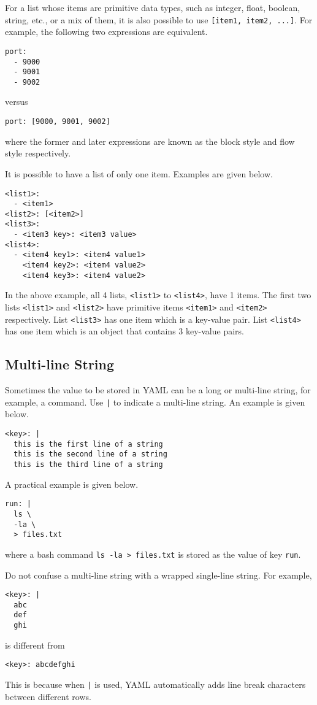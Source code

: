 For a list whose items are primitive data types, such as integer, float, boolean, string, etc., or a mix of them, it is also possible to use \verb|[item1, item2, ...]|. For example, the following two expressions are equivalent.
\begin{lstlisting}
port:
  - 9000
  - 9001
  - 9002
\end{lstlisting}
versus
\begin{lstlisting}
port: [9000, 9001, 9002]
\end{lstlisting}
where the former and later expressions are known as the block style and flow style respectively.

It is possible to have a list of only one item. Examples are given below.
\begin{lstlisting}
<list1>:
  - <item1>
<list2>: [<item2>]
<list3>:
  - <item3 key>: <item3 value>
<list4>:
  - <item4 key1>: <item4 value1>
    <item4 key2>: <item4 value2>
    <item4 key3>: <item4 value2>
\end{lstlisting}
In the above example, all 4 lists, \verb|<list1>| to \verb|<list4>|, have 1 items. The first two lists \verb|<list1>| and \verb|<list2>| have primitive items \verb|<item1>| and \verb|<item2>| respectively. List \verb|<list3>| has one item which is a key-value pair. List \verb|<list4>| has one item which is an object that contains 3 key-value pairs.


\subsection{Multi-line String}

Sometimes the value to be stored in YAML can be a long or multi-line string, for example, a command. Use \texttt{|} to indicate a multi-line string. An example is given below.
\begin{lstlisting}
<key>: |
  this is the first line of a string
  this is the second line of a string
  this is the third line of a string
\end{lstlisting}
A practical example is given below.
\begin{lstlisting}
run: |
  ls \
  -la \
  > files.txt
\end{lstlisting}
where a bash command \verb|ls -la > files.txt| is stored as the value of key \verb|run|.

Do not confuse a multi-line string with a wrapped single-line string. For example,
\begin{lstlisting}
<key>: |
  abc
  def
  ghi
\end{lstlisting}
is different from
\begin{lstlisting}
<key>: abcdefghi
\end{lstlisting}
This is because when \texttt{|} is used, YAML automatically adds line break characters between different rows.

